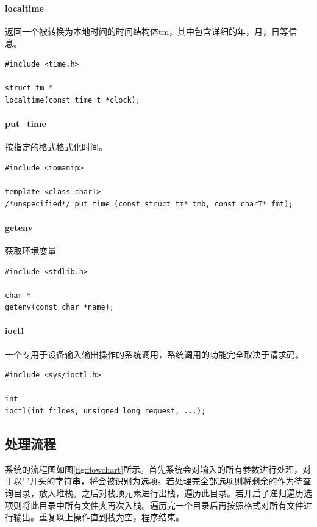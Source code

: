 \documentclass[UTF8,zihao=5,AutoFakeBold]{ctexart}
\begin{document}
\paragraph{localtime\cite{CTIME}}
返回一个被转换为本地时间的时间结构体tm，其中包含详细的年，月，日等信息。
\begin{lstlisting}[numbers=none]
#include <time.h>

struct tm *
localtime(const time_t *clock);
\end{lstlisting}

\paragraph{put\_time\cite{put_time}}
按指定的格式格式化时间。
\begin{lstlisting}[numbers=none]
#include <iomanip>

template <class charT>
/*unspecified*/ put_time (const struct tm* tmb, const charT* fmt);
\end{lstlisting}

\paragraph{getenv\cite{GETENV}}
获取环境变量
\begin{lstlisting}[numbers=none]
#include <stdlib.h>

char *
getenv(const char *name);
\end{lstlisting}

\paragraph{ioctl\cite{IOCTL}}
一个专用于设备输入输出操作的系统调用，系统调用的功能完全取决于请求码。
\begin{lstlisting}[numbers=none]
#include <sys/ioctl.h>

int
ioctl(int fildes, unsigned long request, ...);
\end{lstlisting}
\newpage
\subsection{处理流程}

系统的流程图如图\ref{fig:flowchart}所示。首先系统会对输入的所有参数进行处理，对于以'-'开头的字符串，将会被识别为选项。若处理完全部选项则将剩余的作为待查询目录，放入堆栈。之后对栈顶元素进行出栈，遍历此目录。若开启了递归遍历选项则将此目录中所有文件夹再次入栈。遍历完一个目录后再按照格式对所有文件进行输出。重复以上操作直到栈为空，程序结束。
\end{document}
